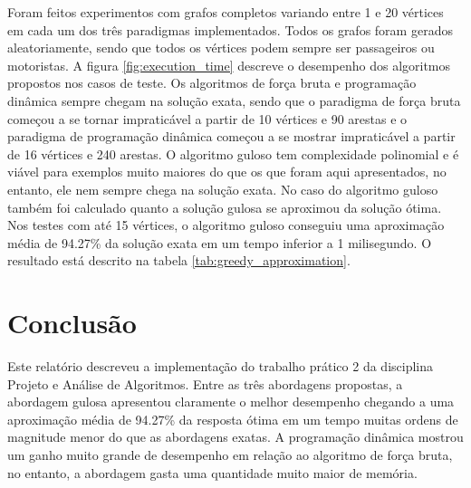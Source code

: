 \documentclass{article}
\begin{document}
Foram feitos experimentos com grafos completos variando entre 1 e 20 vértices em cada um dos três paradigmas implementados. 
Todos os grafos foram gerados aleatoriamente, sendo que todos os vértices podem sempre ser passageiros ou motoristas.
A figura \ref{fig:execution_time} descreve o desempenho dos algoritmos propostos nos casos de teste. Os algoritmos de força bruta 
e programação dinâmica sempre chegam na solução exata, sendo que o paradigma de força bruta começou a se tornar impraticável a partir de
10 vértices e 90 arestas e o paradigma de programação dinâmica começou a se mostrar impraticável a partir de 16 vértices e 240 arestas.
O algoritmo guloso tem complexidade polinomial e é viável para exemplos muito maiores do que os que foram aqui apresentados, no entanto,
ele nem sempre chega na solução exata. No caso do algoritmo guloso também foi calculado quanto a solução gulosa se aproximou da solução ótima. 
Nos testes com até 15 vértices, o algoritmo guloso conseguiu uma aproximação média de 94.27\% da solução exata em um tempo inferior a 1 milisegundo.
O resultado está descrito na tabela \ref{tab:greedy_approximation}.

\section{Conclusão}

Este relatório descreveu a implementação do trabalho prático 2 da disciplina Projeto e Análise de Algoritmos. Entre as três abordagens
propostas, a abordagem gulosa apresentou claramente o melhor desempenho chegando a uma aproximação média de 94.27\% da resposta ótima
em um tempo muitas ordens de magnitude menor do que as abordagens exatas. A programação dinâmica mostrou um ganho muito grande de desempenho 
em relação ao algoritmo de força bruta, no entanto, a abordagem gasta uma quantidade muito maior de memória.
\end{document}
